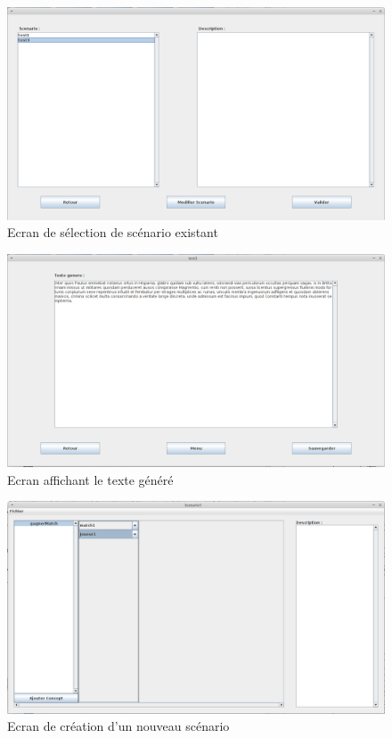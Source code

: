 \documentclass[12pt]{report}
\begin{document}
\begin{figure}
\centering
\includegraphics[scale=0.3]{IHM/selection_scenario.png}
\caption{Ecran de sélection de scénario existant}
\end{figure}

\begin{figure}
\centering
\includegraphics[scale=0.3]{IHM/affichage_resultat.png}
\caption{Ecran affichant le texte généré}
\end{figure}

\begin{figure}
\centering
\includegraphics[scale=0.3]{IHM/remplissage_scenario.png}
\caption{Ecran de création d'un nouveau scénario}
\end{figure}
\end{document}
